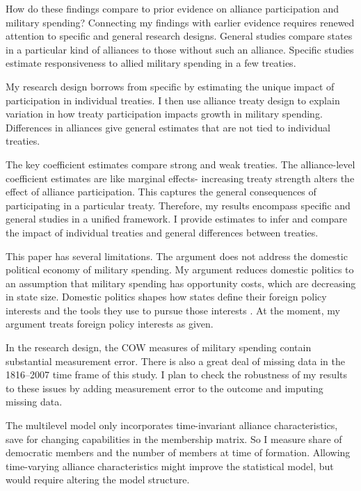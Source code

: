 \documentclass[12pt]{article}
\begin{document}
How do these findings compare to prior evidence on alliance participation and military spending? 
Connecting my findings with earlier evidence requires renewed attention to specific and general research designs. 
General studies compare states in a particular kind of alliances to those without such an alliance. 
Specific studies estimate responsiveness to allied military spending in a few treaties. 


My research design borrows from specific by estimating the unique impact of participation in individual treaties. 
I then use alliance treaty design to explain variation in how treaty participation impacts growth in military spending.
Differences in alliances give general estimates that are not tied to individual treaties.  


The key coefficient estimates compare strong and weak treaties. 
The alliance-level coefficient estimates are like marginal effects- increasing treaty strength alters the effect of alliance participation.
This captures the general consequences of participating in a particular treaty. 
Therefore, my results encompass specific and general studies in a unified framework. 
I provide estimates to infer and compare the impact of individual treaties and general differences between treaties. 


This paper has several limitations.
The argument does not address the domestic political economy of military spending. 
My argument reduces domestic politics to an assumption that military spending has opportunity costs, which are decreasing in state size. 
Domestic politics shapes how states define their foreign policy interests and the tools they use to pursue those interests \citep{Fordham1998, Fordham2011, Narizny2007}.
At the moment, my argument treats foreign policy interests as given.  


In the research design, the COW measures of military spending contain substantial measurement error. 
There is also a great deal of missing data in the 1816--2007 time frame of this study. 
I plan to check the robustness of my results to these issues by adding measurement error to the outcome and imputing missing data.


The multilevel model only incorporates time-invariant alliance characteristics, save for changing capabilities in the membership matrix. 
So I measure share of democratic members and the number of members at time of formation. 
Allowing time-varying alliance characteristics might improve the statistical model, but would require altering the model structure. 
\end{document}
